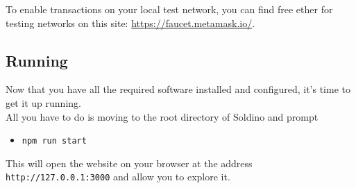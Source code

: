 To enable transactions on your local test network, you can find free ether for testing networks on this site: \href{https://faucet.metamask.io/}{https://faucet.metamask.io/}.


\subsection{Running}
Now that you have all the required software installed and configured, it's time to get it up running.\\
All you have to do is moving to the root directory of Soldino and prompt
\begin{itemize}
	\item[]\texttt{npm run start}
\end{itemize}
This will open the website on your browser at the address \texttt{http://127.0.0.1:3000} and allow you to explore it. 


%
% 
